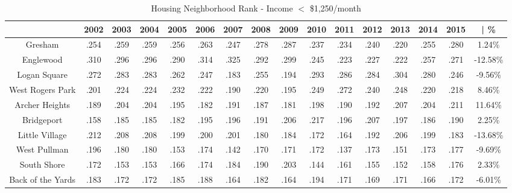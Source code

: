 \documentclass{article}
\theoremstyle{definition}
\theoremstyle{remark}
\begin{document}
\begin{table}[h]\centering
\caption{Housing Neighborhood Rank -  Income $<$ \$1,250/month}\label{thelabel}
\begin{adjustbox}{center}
\begin{tabular}{||c | c c c c c c c c c c c c c c | c ||} 
 \hline
 & 2002 & 2003 & 2004 & 2005 & 2006 & 2007 & 2008 & 2009 & 2010 & 2011 & 2012 & 2013 & 2014 & 2015 & | \%\\[0.5ex] 
 \hline\hline
Gresham & .254 & .259 & .259 & .256 & .263 & .247 & .278 & .287 & .237 & .234 & .240 & .220 & .255 & .280 & 1.24\% \\
Englewood & .310 & .296 & .296 & .290 & .314 & .325 & .292 & .299 & .245 & .223 & .227 & .222 & .257 & .271 & -12.58\% \\
Logan Square & .272 & .283 & .283 & .262 & .247 & .183 & .255 & .194 & .293 & .286 & .284 & .304 & .280 & .246 & -9.56\% \\
West Rogers Park & .201 & .224 & .224 & .232 & .222 & .190 & .220 & .195 & .249 & .272 & .240 & .248 & .220 & .218 & 8.46\% \\
Archer Heights & .189 & .204 & .204 & .195 & .182 & .191 & .187 & .181 & .198 & .190 & .192 & .207 & .204 & .211 & 11.64\% \\
Bridgeport & .158 & .185 & .185 & .182 & .195 & .196 & .191 & .206 & .217 & .196 & .207 & .197 & .186 & .190 & 2.25\% \\
Little Village & .212 & .208 & .208 & .199 & .200 & .201 & .180 & .184 & .172 & .164 & .192 & .206 & .199 & .183 & -13.68\% \\
West Pullman & .196 & .180 & .180 & .153 & .174 & .142 & .170 & .171 & .172 & .137 & .173 & .151 & .173 & .177 & -9.69\% \\
South Shore & .172 & .153 & .153 & .166 & .174 & .184 & .190 & .203 & .144 & .161 & .155 & .152 & .158 & .176 & 2.33\% \\
Back of the Yards & .183 & .172 & .172 & .185 & .188 & .164 & .182 & .164 & .194 & .171 & .169 & .171 & .166 & .172 & -6.01\% \\
\hline
 \end{tabular}
\end{adjustbox}
\end{table}
\end{document}

